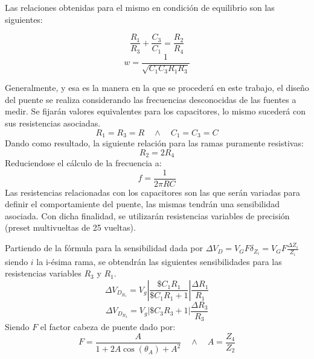 Las relaciones obtenidas para el mismo en condición de equilibrio son las siguientes: \par
\begin{equation}
\frac{R_1}{R_3}+\frac{C_3}{C_1}=\frac{R_2}{R_4}
\end{equation}
\begin{equation}
w=\frac{1}{\sqrt{C_1C_3R_1R_3}}
\end{equation} \par
Generalmente, y esa es la manera en la que se procederá en este trabajo, el diseño del puente se realiza considerando las frecuencias desconocidas de las fuentes a medir. Se fijarán valores equivalentes para los capacitores, lo mismo sucederá con sus resistencias asociadas. 
\begin{equation}
R_1=R_3=R \quad	\wedge \quad C_1=C_3=C
\end{equation}
Dando como resultado, la siguiente relación para las ramas puramente resistivas:
\begin{equation}
R_2=2R_4
\end{equation}
Reduciendose el cálculo de la frecuencia a:
\begin{equation}
f=\frac{1}{2\pi RC}
\label{frec}
\end{equation}
Las resistencias relacionadas con los capacitores son las que serán variadas para definir el comportamiente del puente, las mismas tendrán una sensibilidad asociada. Con dicha finalidad, se utilizarán resistencias variables de precisión (preset multivueltas de 25 vueltas). 

Partiendo de la fórmula para la sensibilidad dada por $\Delta V_D=V_GF\delta_{Z_i}=V_GF\frac{\Delta Z_i}{Z_i}$ siendo $i$ la i-ésima rama, se obtendrán las siguientes sensibilidades para las resistencias variables $R_3$ y $R_1$.
\begin{equation}
\Delta V_{D_{R_1}}=V_g\left|\frac{\$C_1R_1}{\$C_1R_1+1}\right|\frac{\Delta R_1}{R_1}
\label{VDR1}
\end{equation}
\begin{equation}
\Delta V_{D_{R_3}}=V_g\left|\$C_3R_3+1\right|\frac{\Delta R_3}{R_3}
\label{VDR3}
\end{equation}
Siendo $F$ el factor cabeza de puente dado por:
\begin{equation}
F=\frac{A}{1+2A\cos(\theta_A)+A^2} \quad \wedge \quad A=\frac{Z_4}{Z_2}
\label{cabeza_de_puente}
\end{equation} 

